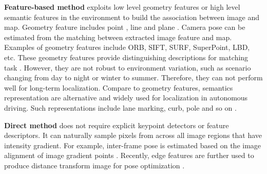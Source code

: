 \documentclass[letterpaper, 10 pt, conference]{ieeeconf}
\begin{document}
\textbf{Feature-based method} exploits low level geometry features or high level semantic features in the environment to build the association between image and map. Geometry feature includes point \cite{mur2017orb}, line \cite{yu2020Monocular} and plane \cite{yang2016pop}.  Camera pose can be estimated from the matching between extracted image feature and map. 
Examples of geometry features include ORB, SIFT, SURF, SuperPoint, LBD, etc. These geometry features provide distinguishing descriptions for matching task \cite{detone2018superpoint, zhang2013efficient}. However, they are not robust to environment variation, such as scenario changing from day to night or winter to summer. Therefore, they can not perform well for long-term localization. Compare to geometry features, semantics representation are alternative and widely used for localization in autonomous driving. Such representations include lane marking, curb, pole and so on \cite{schreiber2013laneloc, xiao2018monocular, xiao2020monocular, lu2017Monocular}.




\textbf{Direct method} does not require explicit keypoint detectors or feature descriptors. It can naturally sample pixels from across all image regions that have intensity gradient. For example, inter-frame pose is estimated based on the image alignment of image gradient points \cite{engel2017direct}. Recently, edge features are further used to produce distance transform image for pose optimization \cite{schenk2017robust, schenk2019reslam, kuse2016robust}.

\end{document}
